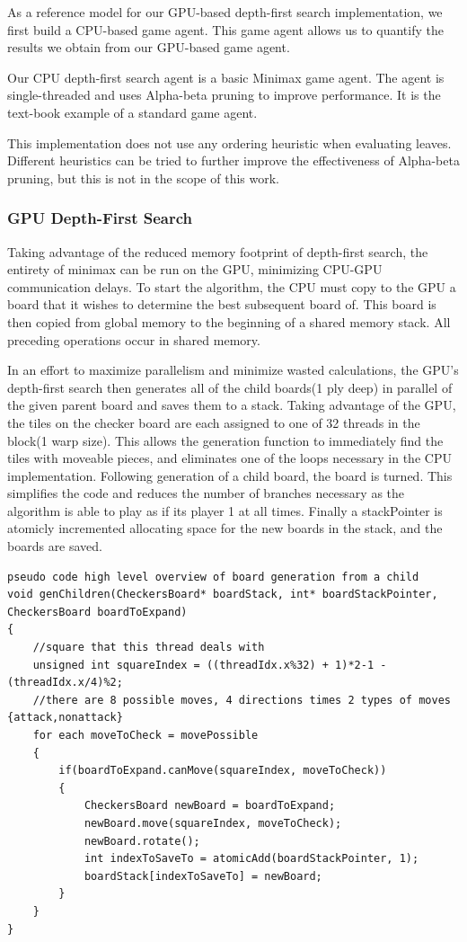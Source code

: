 \documentclass[11pt]{article}
\begin{document}
As a reference model for our GPU-based depth-first search implementation, we
first build a CPU-based game agent. This game agent allows us to quantify the
results we obtain from our GPU-based game agent.

Our CPU depth-first search agent is a basic Minimax game agent. The agent is
single-threaded and uses Alpha-beta pruning to improve performance. It
is the text-book example of a standard game agent.

This implementation does not use any ordering heuristic when evaluating leaves.
Different heuristics can be tried to further improve the effectiveness of
Alpha-beta pruning, but this is not in the scope of this work.

\subsubsection{GPU Depth-First Search}
\label{sec:GPUDFSalgo}

Taking advantage of the reduced memory footprint of depth-first search, the
entirety of minimax can be run on the GPU, minimizing CPU-GPU communication
delays. To start the algorithm, the CPU must copy to the GPU a board that it
wishes to determine the best subsequent board of. This board is then copied from
global memory to the beginning of a shared memory stack.  All preceding
operations occur in shared memory.

In an effort to maximize parallelism and minimize wasted calculations, the GPU's
depth-first search then generates all of the child boards(1 ply deep) in
parallel of the given parent board and saves them to a stack. Taking advantage
of the GPU, the tiles on the checker board are each assigned to one of 32
threads in the block(1 warp size). This allows the generation function to
immediately find the tiles with moveable pieces, and eliminates one of the loops
necessary in the CPU implementation. Following generation of a child board, the
board is turned. This simplifies the code and reduces the number of branches
necessary as the algorithm is able to play as if its player 1 at all times.
Finally a stackPointer is atomicly incremented allocating space for the new
boards in the stack, and the boards are saved. 

\begin{lstlisting}
pseudo code high level overview of board generation from a child
void genChildren(CheckersBoard* boardStack, int* boardStackPointer, CheckersBoard boardToExpand)
{
    //square that this thread deals with
    unsigned int squareIndex = ((threadIdx.x%32) + 1)*2-1 - (threadIdx.x/4)%2;  
    //there are 8 possible moves, 4 directions times 2 types of moves {attack,nonattack}
    for each moveToCheck = movePossible
    {
        if(boardToExpand.canMove(squareIndex, moveToCheck))
        {
            CheckersBoard newBoard = boardToExpand;
            newBoard.move(squareIndex, moveToCheck);
            newBoard.rotate();
            int indexToSaveTo = atomicAdd(boardStackPointer, 1);
            boardStack[indexToSaveTo] = newBoard;
        }
    }
}
\end{lstlisting}
\end{document}
